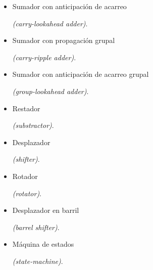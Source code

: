 \begin{itemize}
    \item \hypertarget{carry-lookahead_adder}{Sumador con anticipación de acarreo} \emph{(carry-lookahead adder)}.
    \item \hypertarget{group-ripple_adder}{Sumador con propagación grupal} \emph{(carry-ripple adder)}.
    \item \hypertarget{group-lookahead_adder}{Sumador con anticipación de acarreo grupal} \emph{(group-lookahead adder)}.
    \item \hypertarget{substractor}{Restador} \emph{(substractor)}.
    \item \hypertarget{shifter}{Desplazador} \emph{(shifter)}.
    \item \hypertarget{rotator}{Rotador} \emph{(rotator)}.
    \item \hypertarget{barrel_shifter}{Desplazador en barril} \emph{(barrel shifter)}.
    \item \hypertarget{state_machine}{Máquina de estados} \emph{(state-machine)}.
\end{itemize}